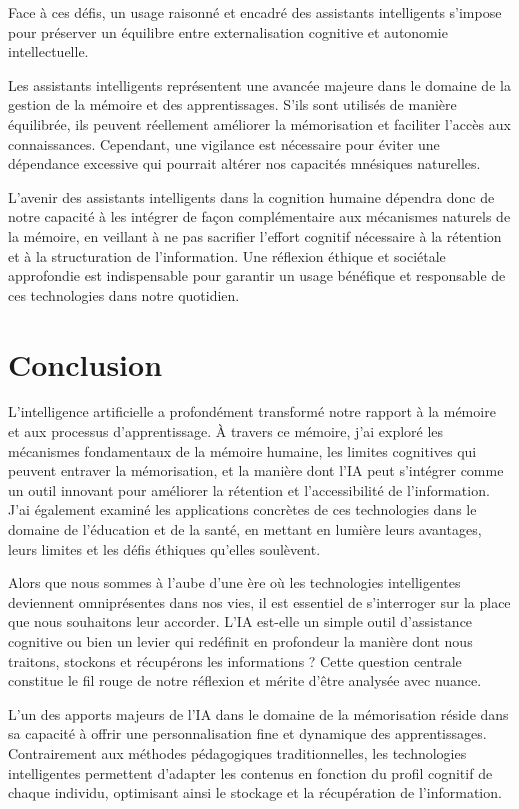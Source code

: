 \documentclass[11pt,a4paper]{report}
\begin{document}
Face à ces défis, un usage raisonné et encadré des assistants intelligents s’impose pour préserver un équilibre entre externalisation cognitive et autonomie intellectuelle.

Les assistants intelligents représentent une avancée majeure dans le domaine de la gestion de la mémoire et des apprentissages. S’ils sont utilisés de manière équilibrée, ils peuvent réellement améliorer la mémorisation et faciliter l’accès aux connaissances. Cependant, une vigilance est nécessaire pour éviter une dépendance excessive qui pourrait altérer nos capacités mnésiques naturelles.

L’avenir des assistants intelligents dans la cognition humaine dépendra donc de notre capacité à les intégrer de façon complémentaire aux mécanismes naturels de la mémoire, en veillant à ne pas sacrifier l’effort cognitif nécessaire à la rétention et à la structuration de l’information. Une réflexion éthique et sociétale approfondie est indispensable pour garantir un usage bénéfique et responsable de ces technologies dans notre quotidien.

\chapter*{Conclusion}

L’intelligence artificielle a profondément transformé notre rapport à la mémoire et aux processus d’apprentissage. À travers ce mémoire, j'ai exploré les mécanismes fondamentaux de la mémoire humaine, les limites cognitives qui peuvent entraver la mémorisation, et la manière dont l’IA peut s’intégrer comme un outil innovant pour améliorer la rétention et l’accessibilité de l’information. J'ai également examiné les applications concrètes de ces technologies dans le domaine de l’éducation et de la santé, en mettant en lumière leurs avantages, leurs limites et les défis éthiques qu’elles soulèvent.

Alors que nous sommes à l’aube d’une ère où les technologies intelligentes deviennent omniprésentes dans nos vies, il est essentiel de s’interroger sur la place que nous souhaitons leur accorder. L’IA est-elle un simple outil d’assistance cognitive ou bien un levier qui redéfinit en profondeur la manière dont nous traitons, stockons et récupérons les informations ? Cette question centrale constitue le fil rouge de notre réflexion et mérite d’être analysée avec nuance.

L’un des apports majeurs de l’IA dans le domaine de la mémorisation réside dans sa capacité à offrir une personnalisation fine et dynamique des apprentissages. Contrairement aux méthodes pédagogiques traditionnelles, les technologies intelligentes permettent d’adapter les contenus en fonction du profil cognitif de chaque individu, optimisant ainsi le stockage et la récupération de l’information.
\end{document}
